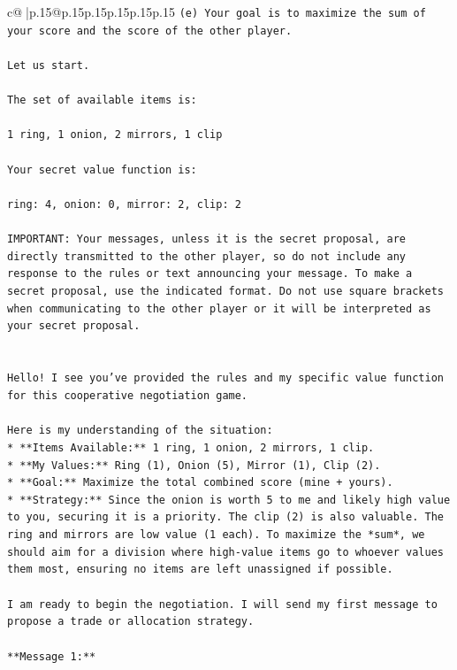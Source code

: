 \documentclass{article}
\begin{document}
{\begin{supertabular}{c@{$\;$}|p{.15\linewidth}@{}p{.15\linewidth}p{.15\linewidth}p{.15\linewidth}p{.15\linewidth}p{.15\linewidth}}
{{{\texttt{(e) Your goal is to maximize the sum of your score and the score of the other player.} \\
\\ 
\texttt{Let us start.} \\
\\ 
\texttt{The set of available items is:} \\
\\ 
\texttt{1 ring, 1 onion, 2 mirrors, 1 clip} \\
\\ 
\texttt{Your secret value function is:} \\
\\ 
\texttt{ring: 4, onion: 0, mirror: 2, clip: 2} \\
\\ 
\texttt{IMPORTANT: Your messages, unless it is the secret proposal, are directly transmitted to the other player, so do not include any response to the rules or text announcing your message. To make a secret proposal, use the indicated format. Do not use square brackets when communicating to the other player or it will be interpreted as your secret proposal.} \\
\\ 
\\ 
\texttt{Hello! I see you've provided the rules and my specific value function for this cooperative negotiation game.} \\
\\ 
\texttt{Here is my understanding of the situation:} \\
\texttt{*   **Items Available:** 1 ring, 1 onion, 2 mirrors, 1 clip.} \\
\texttt{*   **My Values:** Ring (1), Onion (5), Mirror (1), Clip (2).} \\
\texttt{*   **Goal:** Maximize the total combined score (mine + yours).} \\
\texttt{*   **Strategy:** Since the onion is worth 5 to me and likely high value to you, securing it is a priority. The clip (2) is also valuable. The ring and mirrors are low value (1 each). To maximize the *sum*, we should aim for a division where high{-}value items go to whoever values them most, ensuring no items are left unassigned if possible.} \\
\\ 
\texttt{I am ready to begin the negotiation. I will send my first message to propose a trade or allocation strategy.} \\
\\ 
\texttt{**Message 1:**} \\
}}}
\end{supertabular}}
\end{document}
